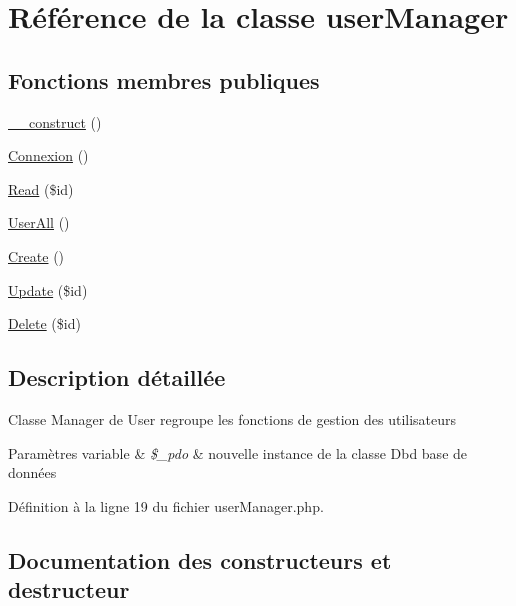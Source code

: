 \hypertarget{class_src_1_1_managers_1_1user_manager}{}\section{Référence de la classe user\+Manager}
\label{class_src_1_1_managers_1_1user_manager}
\subsection*{Fonctions membres publiques}
\begin{DoxyCompactItemize}
\item 
\hyperlink{class_src_1_1_managers_1_1user_manager_a095c5d389db211932136b53f25f39685}{\+\_\+\+\_\+construct} ()
\item 
\hyperlink{class_src_1_1_managers_1_1user_manager_a00fdd5c0ca353b468ea33fb246c28d90}{Connexion} ()
\item 
\hyperlink{class_src_1_1_managers_1_1user_manager_ad2bbc9b3130abdfe3a9fc9e9fe36716f}{Read} (\$id)
\item 
\hyperlink{class_src_1_1_managers_1_1user_manager_a0a377befd1052a5f989fd915af31373b}{User\+All} ()
\item 
\hyperlink{class_src_1_1_managers_1_1user_manager_ad01f71fa0ecc039494e3c282864298c3}{Create} ()
\item 
\hyperlink{class_src_1_1_managers_1_1user_manager_a82232b33fbfacdbdb8a8f49acaecf564}{Update} (\$id)
\item 
\hyperlink{class_src_1_1_managers_1_1user_manager_a59113b5ecd1d155db6a4f30af34a1e80}{Delete} (\$id)
\end{DoxyCompactItemize}


\subsection{Description détaillée}
Classe Manager de User regroupe les fonctions de gestion des utilisateurs 
\begin{DoxyParams}[1]{Paramètres}
variable & {\em \$\+\_\+pdo} & nouvelle instance de la classe Dbd base de données \\
\hline
\end{DoxyParams}


Définition à la ligne 19 du fichier user\+Manager.\+php.



\subsection{Documentation des constructeurs et destructeur}
\mbox{\label{class_src_1_1_managers_1_1user_manager_a095c5d389db211932136b53f25f39685}} 
